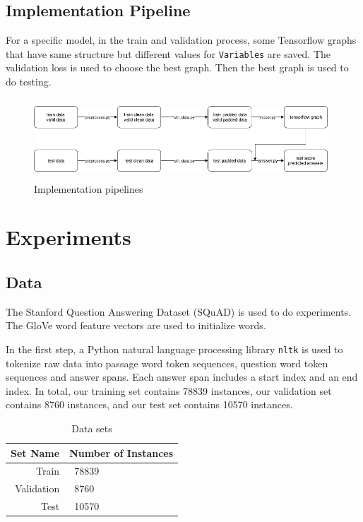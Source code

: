 \documentclass[modernstyle,12pt]{sjsuthesis}
\theoremstyle{definition}
\begin{document}
\section{Implementation Pipeline}

For a specific model, in the train and validation process, some Tensorflow graphs that have same structure but different values for {\tt Variables} are saved. The validation loss is used to choose the best graph. Then the best graph is used to do testing.

\begin{figure}[htbp]\centering
  \includegraphics[width=11cm, height=3cm]{figures/pipeline.png}
  \caption{Implementation pipelines}
  \label{f:pipeline}
\end{figure}


\chapter{Experiments}
\section{Data}
The Stanford Question Answering Dataset (SQuAD) is used to do experiments. The GloVe word feature vectors\cite{pennington2014glove} are used to initialize words.

In the first step, a Python natural language processing library {\tt nltk} is used to tokenize raw data into passage word token sequences, question word token sequences and answer spans. Each answer span includes a start index and an end index. In total, our training set contains 78839 instances, our validation set contains 8760 instances, and our test set contains 10570 instances.

\begin{table}[htbp]\centering
  \caption{Data sets}
  \label{tab:dataset}
  \begin{tabular}{|r|l|} \hline
    Set Name & Number of Instances \\ \hline\hline
    Train & \ 78839 \\
    Validation & \ 8760 \\
    Test & \ 10570 \\ \hline
  \end{tabular}
\end{table}
\end{document}
